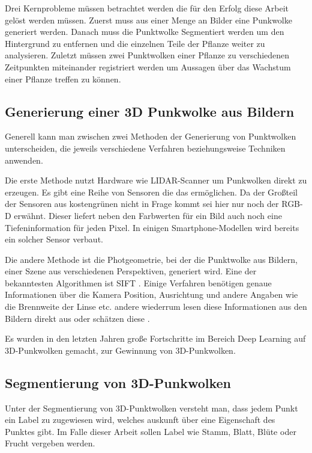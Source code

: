 \documentclass[12pt,titlepage, twoside]{article}
\begin{document}
Drei Kernprobleme müssen betrachtet werden die für den Erfolg diese Arbeit gelöst werden müssen. 
Zuerst muss aus einer Menge an Bilder eine Punkwolke generiert werden. Danach muss die Punktwolke Segmentiert werden um den Hintergrund zu entfernen und die einzelnen Teile der Pflanze weiter zu analysieren. 
Zuletzt müssen zwei Punktwolken einer Pflanze zu verschiedenen Zeitpunkten miteinander registriert werden um Aussagen über das Wachstum einer Pflanze treffen zu können.

\subsection{Generierung einer 3D Punkwolke aus Bildern}
\label{sec:stand:pointcloud}

Generell kann man zwischen zwei Methoden der Generierung von Punktwolken unterscheiden, die jeweils verschiedene Verfahren beziehungsweise Techniken anwenden.

Die erste Methode nutzt Hardware wie LIDAR-Scanner \cite{lidar} um Punkwolken direkt zu erzeugen. Es gibt eine Reihe von Sensoren die das ermöglichen. Da der Großteil der Sensoren aus kostengrünen nicht in Frage kommt sei hier nur noch der RGB-D erwähnt. 
Dieser liefert neben den Farbwerten für ein Bild auch noch eine Tiefeninformation für jeden Pixel. In einigen Smartphone-Modellen wird bereits ein solcher Sensor verbaut.

Die andere Methode ist die Photgeometrie, bei der die Punktwolke aus Bildern, einer Szene aus verschiedenen Perspektiven, generiert wird. Eine der bekanntesten Algorithmen ist SIFT \cite{Sift3D}.
Einige Verfahren benötigen genaue Informationen über die Kamera Position, Ausrichtung und andere Angaben wie die Brennweite der Linse etc. andere wiederrum lesen diese Informationen aus den Bildern direkt aus oder schätzen diese \cite{ODM}.

Es wurden in den letzten Jahren große Fortschritte im Bereich Deep Learning auf 3D-Punkwolken gemacht, zur Gewinnung von 3D-Punkwolken.


\subsection{Segmentierung von 3D-Punkwolken}
\label{sec:stand:segmentierung}

Unter der Segmentierung von 3D-Punktwolken versteht man, dass jedem Punkt ein Label zu zugewiesen wird, welches auskunft über eine Eigenschaft des Punktes gibt. Im Falle dieser Arbeit sollen Label wie Stamm, Blatt, Blüte oder Frucht vergeben werden.
\end{document}

